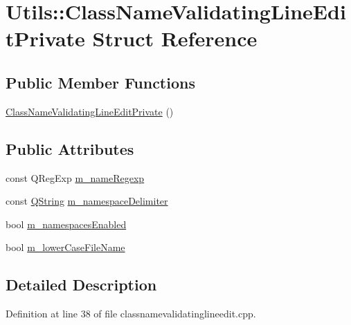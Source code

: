\hypertarget{struct_utils_1_1_class_name_validating_line_edit_private}{\section{\-Utils\-:\-:\-Class\-Name\-Validating\-Line\-Edit\-Private \-Struct \-Reference}
\label{struct_utils_1_1_class_name_validating_line_edit_private}
}
\subsection*{\-Public \-Member \-Functions}
\begin{DoxyCompactItemize}
\item 
\hyperlink{struct_utils_1_1_class_name_validating_line_edit_private_a37cb7e6677b13d031aff6103b1abb3ce}{\-Class\-Name\-Validating\-Line\-Edit\-Private} ()
\end{DoxyCompactItemize}
\subsection*{\-Public \-Attributes}
\begin{DoxyCompactItemize}
\item 
const \-Q\-Reg\-Exp \hyperlink{struct_utils_1_1_class_name_validating_line_edit_private_a3b1964b13bc15a3ae11f83e12942fd99}{m\-\_\-name\-Regexp}
\item 
const \hyperlink{group___u_a_v_objects_plugin_gab9d252f49c333c94a72f97ce3105a32d}{\-Q\-String} \hyperlink{struct_utils_1_1_class_name_validating_line_edit_private_a83c2d2b3c70dd5300a1bc57e518ed3d5}{m\-\_\-namespace\-Delimiter}
\item 
bool \hyperlink{struct_utils_1_1_class_name_validating_line_edit_private_aac53edaa6749894e449523e8d60c5ec1}{m\-\_\-namespaces\-Enabled}
\item 
bool \hyperlink{struct_utils_1_1_class_name_validating_line_edit_private_a2f28084151e090c3dadfe1d2749fa0a6}{m\-\_\-lower\-Case\-File\-Name}
\end{DoxyCompactItemize}


\subsection{\-Detailed \-Description}


\-Definition at line 38 of file classnamevalidatinglineedit.\-cpp.



